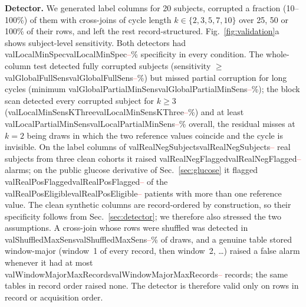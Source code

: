 \documentclass[journal]{IEEEtran}
\newcommand{\m}[1]{\ifcsname #1\endcsname\csname #1\endcsname\else\textcolor{red}{--}\fi}
\begin{document}
\textbf{Detector.}  We generated label columns for 20 subjects, corrupted a
fraction (10--100\%) of them with cross-joins of cycle length $k\in\{2,3,5,7,10\}$
over 25, 50 or 100\% of their rows, and left the rest record-structured.
Fig.~\ref{fig:validation}a shows subject-level sensitivity.  Both detectors
had \m{valLocalMinSpec}\% specificity in every condition.  The whole-column
test detected fully corrupted subjects (sensitivity $\ge$\m{valGlobalFullSens}\%)
but missed partial corruption for long cycles (minimum \m{valGlobalPartialMinSens}\%);
the block scan detected every corrupted subject for $k\ge3$
(\m{valLocalMinSensKThree}\%) and at least \m{valLocalPartialMinSens}\% overall,
the residual misses at $k=2$ being draws in which the two reference values
coincide and the cycle is invisible.  On the label columns of
\m{valRealNegSubjects} real subjects from three clean cohorts it raised
\m{valRealNegFlagged} alarms; on the public glucose derivative of
Sec.~\ref{sec:glucose} it flagged \m{valRealPosFlagged} of the
\m{valRealPosEligible} patients with more than one reference value.  The
clean synthetic columns are record-ordered by construction, so their
specificity follows from Sec.~\ref{sec:detector}; we therefore also stressed
the two assumptions.  A cross-join whose rows were shuffled was detected in
\m{valShuffledMaxSens}\% of draws, and a genuine table stored window-major
(window~1 of every record, then window~2, \dots) raised a false alarm whenever
it had at most \m{valWindowMajorMaxRecords} records; the same tables in record
order raised none.  The detector is therefore valid only on rows in record or
acquisition order.
\end{document}
